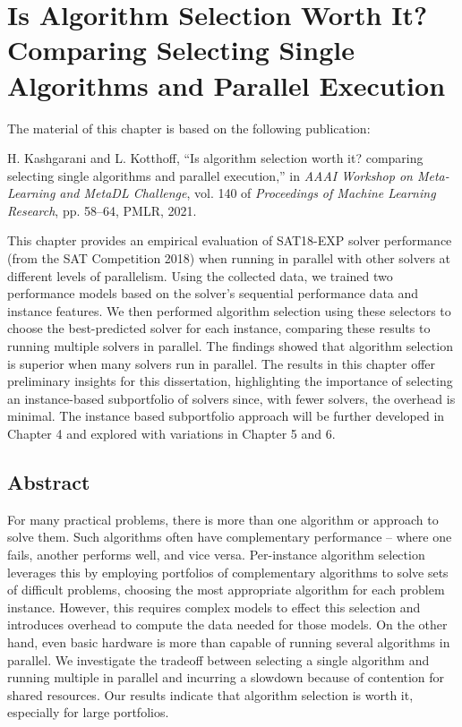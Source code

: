 
\chapter{Is Algorithm Selection Worth It? \\ Comparing Selecting Single Algorithms and Parallel Execution}

The material of this chapter is based on the following publication: 

H. Kashgarani and L. Kotthoff, “Is algorithm selection worth it? comparing selecting
single algorithms and parallel execution,” in \textit{AAAI Workshop on Meta-Learning and
MetaDL Challenge}, vol. 140 of \textit{Proceedings of Machine Learning Research}, pp. 58–64,
PMLR, 2021.


This chapter provides an empirical evaluation of SAT18-EXP solver performance (from the SAT Competition 2018) when running in parallel with other solvers at different levels of parallelism. Using the collected data, we trained two performance models based on the solver's sequential performance data and instance features. We then performed algorithm selection using these selectors to choose the best-predicted solver for each instance, comparing these results to running multiple solvers in parallel. The findings showed that algorithm selection is superior when many solvers run in parallel. The results in this chapter offer preliminary insights for this dissertation, highlighting the importance of selecting an instance-based subportfolio of solvers since, with fewer solvers, the overhead is minimal. The instance based subportfolio approach will be further developed in Chapter 4 and explored with variations in Chapter 5 and 6. 

\section{Abstract}
   For many practical problems, there is more than one algorithm or approach to solve them. Such algorithms often have complementary performance -- where one fails, another performs well, and vice versa. Per-instance algorithm selection leverages this by employing portfolios of complementary algorithms to solve sets of difficult problems, choosing the most appropriate algorithm for each problem instance. However, this requires complex models to effect this selection and introduces overhead to compute the data needed for those models. On the other hand, even basic hardware is more than capable of running several algorithms in parallel. We investigate the tradeoff between selecting a single algorithm and running multiple in parallel and incurring a slowdown because of contention for shared resources. Our results indicate that algorithm selection is worth it, especially for large portfolios.

